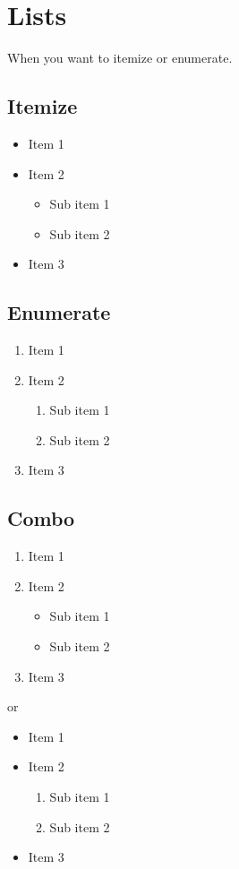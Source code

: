 \chapter{Lists}
When you want to itemize or enumerate.

\section{Itemize}
\begin{itemize}
    \item Item 1
    \item Item 2
    \begin{itemize}
        \item Sub item 1
        \item Sub item 2
    \end{itemize}
    \item Item 3
\end{itemize}

\section{Enumerate}
\begin{enumerate}
    \item Item 1
    \item Item 2
    \begin{enumerate}
        \item Sub item 1
        \item Sub item 2 
    \end{enumerate}
    \item Item 3
\end{enumerate}

\section{Combo}
\begin{enumerate}
    \item Item 1
    \item Item 2
    \begin{itemize}
        \item Sub item 1
        \item Sub item 2 
    \end{itemize}
    \item Item 3
\end{enumerate}

or 

\begin{itemize}
    \item Item 1
    \item Item 2
    \begin{enumerate}
        \item Sub item 1
        \item Sub item 2 
    \end{enumerate}
    \item Item 3
\end{itemize}
